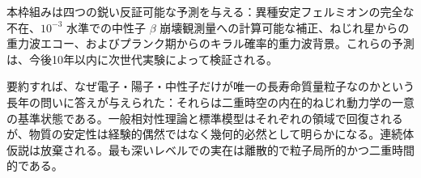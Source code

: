 \documentclass[dvipdfmx,a4paper]{article}
\begin{document}
本枠組みは四つの鋭い反証可能な予測を与える：異種安定フェルミオンの完全な不在、\(10^{-3}\) 水準での中性子 \(\beta\) 崩壊観測量への計算可能な補正、ねじれ星からの重力波エコー、およびプランク期からのキラル確率的重力波背景。これらの予測は、今後10年以内に次世代実験によって検証される。

要約すれば、なぜ電子・陽子・中性子だけが唯一の長寿命質量粒子なのかという長年の問いに答えが与えられた：それらは二重時空の内在的ねじれ動力学の一意の基準状態である。一般相対性理論と標準模型はそれぞれの領域で回復されるが、物質の安定性は経験的偶然ではなく幾何的必然として明らかになる。連続体仮説は放棄される。最も深いレベルでの実在は離散的で粒子局所的かつ二重時間的である。
\end{document}
